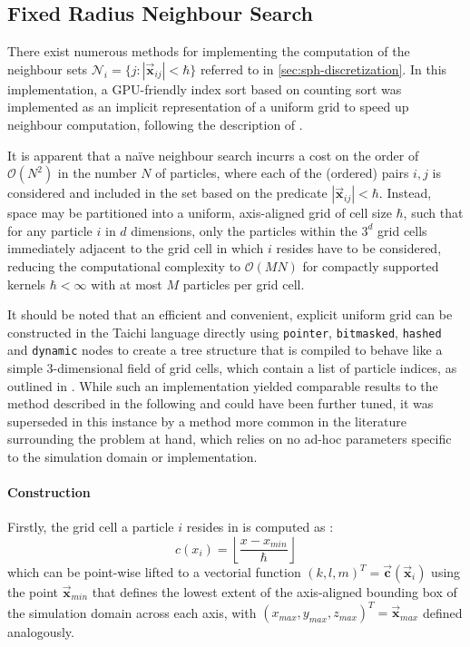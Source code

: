 \documentclass[oneside, a4paper]{book}
\newcommand\abs[1]{\left|#1\right|}
\newcommand\vek[1]{\vec{\bm{#1}}}
\newcommand\br[1]{\left(#1\right)}
\begin{document}
\begin{appendices}
    \chapter{Fixed Radius Neighbour Search}
    There exist numerous methods for implementing the computation of the neighbour sets $\mathcal{N}_i = \{j : \abs{\vek{x}_{ij}}<\hbar\}$ referred to in \autoref{sec:sph-discretization}. In this implementation, a GPU-friendly index sort based on counting sort was implemented as an implicit representation of a uniform grid to speed up neighbour computation, following the description of \autocite[Hoetzlein]{hoetzlein-rama-counting-sort}. 

    It is apparent that a na\"ive neighbour search incurrs a cost on the order of $\mathcal{O}\br{N^2}$ in the number $N$ of particles, where each of the (ordered) pairs $i,j$ is considered and included in the set based on the predicate $\abs{\vek{x}_{ij}}<\hbar$. Instead, space may be partitioned into a uniform, axis-aligned grid of cell size $\hbar$, such that for any particle $i$ in $d$ dimensions, only the particles within the $3^d$ grid cells immediately adjacent to the grid cell in which $i$ resides have to be considered, reducing the computational complexity to $\mathcal{O}(MN)$ for compactly supported kernels $\hbar<\infty$ with at most $M$ particles per grid cell\autocite{tutorial2019}. 
    
    It should be noted that an efficient and convenient, explicit uniform grid can be constructed in the Taichi language directly using \texttt{pointer}, \texttt{bitmasked}, \texttt{hashed} and \texttt{dynamic} nodes to create a tree structure that is compiled to behave like a simple 3-dimensional field of grid cells, which contain a list of particle indices, as outlined in \cite[this paper]{taichi-sparse}. While such an implementation yielded comparable results to the method described in the following and could have been further tuned, it was superseded in this instance by a method more common in the literature surrounding the problem at hand, which relies on no ad-hoc parameters specific to the simulation domain or implementation.

    \subsubsection{Construction}
    Firstly,  the grid cell a particle $i$ resides in is computed as \autocite{compressed-neighbour-lists}:
    \begin{equation}
      c(x_i) =  \left\lfloor\frac{x-x_{min}}{\hbar}\right\rfloor
    \end{equation}
    which can be point-wise lifted to a vectorial function $(k,l,m)^T = \vek{c}\br{\vek{x}_i}$ using the point $\vek{x}_{min}$ that defines the lowest extent of the axis-aligned bounding box of the simulation domain across each axis, with $(x_{max}, y_{max}, z_{max})^T = \vek{x}_{max}$ defined analogously. 
    

\end{appendices}
\end{document}
